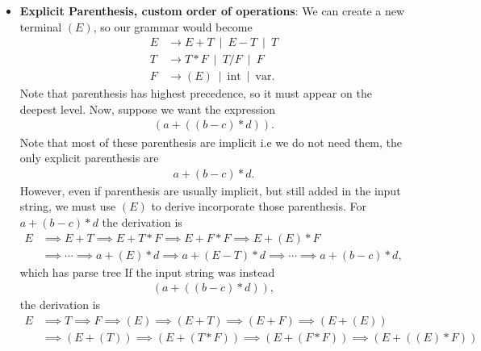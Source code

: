 \documentclass{report}
\begin{document}
\begin{itemize}
            \bigbreak \noindent 
            With this knowledge its easy to see that if we switched the precedence of +,-,*,/ so that +,- appears on a deeper level than *,/, then $a+b$ would be grouped and evaluated before multiplying by $c$.
        \item \textbf{Explicit Parenthesis, custom order of operations}: We can create a new terminal $(E)$, so our grammar would become
            \begin{align*}
                E &\to E + T \ \mid \ E - T \ \mid \ T \\
                T &\to T * F \ \mid \ T / F \ \mid \ F \\
                F &\to (E) \ \mid \ \text{int} \ \mid \ \text{var}
            .\end{align*}
            Note that parenthesis has highest precedence, so it must appear on the deepest level. Now, suppose we want the expression
            \begin{align*}
                (a + ((b-c)*d))
            .\end{align*}
            Note that most of these parenthesis are implicit i.e we do not need them, the only explicit parenthesis are
            \begin{align*}
                a + (b-c) * d
            .\end{align*}
            However, even if parenthesis are usually implicit, but still added in the input string, we must use $(E)$ to derive incorporate those parenthesis. For $a + (b-c) * d$ the derivation is 
            \begin{align*}
                E &\implies E + T \implies E + T * F \implies E + F * F \implies E + (E) * F  \\
                &\implies \cdots \implies a + (E) * d \implies a + (E-T) * d \implies \cdots \implies a + (b-c) * d
            ,\end{align*}
            which has parse tree
            \bigbreak \noindent 
            \bigbreak \noindent 
            If the input string was instead 
            \begin{align*}
                (a + ((b-c) * d))
            ,\end{align*}
            the derivation is 
            \begin{align*}
                E &\implies T \implies F \implies (E) \implies (E + T) \implies (E + F) \implies (E + (E)) \\
                  &\implies (E + (T)) \implies (E + (T * F)) \implies (E + (F * F)) \implies (E + ((E) * F)) \\

\end{align*}
\end{itemize}
\end{document}
